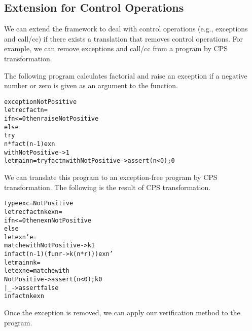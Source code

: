 \subsection{Extension for Control Operations}
\label{sec:control}
We can extend the framework to deal with control operations (e.g., exceptions and call/cc) if there
exists a translation that removes control operations.  For example,
we can remove exceptions and call/cc from a program by CPS transformation.

The following program calculates factorial and raise an exception if
a negative number or zero is given as an argument to the function.
\begin{alltt}
exception NotPositive
let rec fact n =
  if n <= 0 then raise NotPositive
  else
    try
      n * fact (n - 1) exn
    with NotPositive -> 1
let main n = try fact n with NotPositive -> assert (n < 0); 0
\end{alltt}
We can translate this program to an exception-free program by CPS transformation.
The following is the result of CPS transformation.
\begin{alltt}
type exc = NotPositive
let rec fact n k exn =
  if n <= 0 then exn NotPositive
  else
    let exn' e =
      match e with NotPositive -> k 1
    in fact (n - 1) (fun r -> k (n * r))) exn'
let main n k =
  let exn e = match e with
                  NotPositive -> assert (n < 0); k 0
                | _ -> assert false
  in fact n k exn
\end{alltt}
Once the exception is removed, we can apply our verification method to the
program.



